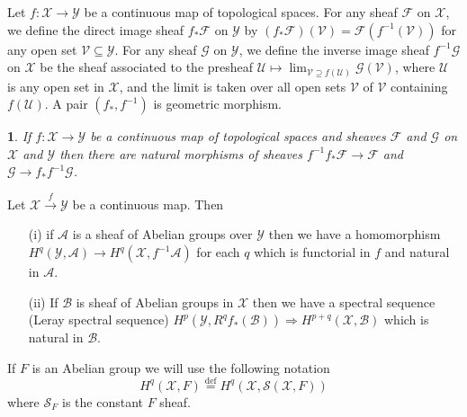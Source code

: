 \documentclass{beamer}
\theoremstyle{plain}
\newtheorem{empt}[prop]{}%
\newcommand{\sU}{\mathcal{U}}       %
\newcommand{\sV}{\mathcal{V}}       %
\newcommand{\sX}{\mathcal{X}}       %
\newcommand{\sY}{\mathcal{Y}}       %
\newcommand{\bydef}{\stackrel{\mathrm{def}}{=}}
\begin{document}
\begin{frame}

\begin{definition}\label{sheaf_inv_im_defn}
	Let $f: \sX\to \sY$ be a continuous map of topological spaces. For any sheaf  $\mathscr F$ on $\sX$, we define the \alert{direct image} sheaf  $f_*\mathscr F$ on $\sY$ by $\left(f_*\mathscr F\right)\left(\sV\right)= \mathscr F\left(f^{-1}\left(\sV\right)\right)$ for any open set $\sV \subseteq \sY$. For any sheaf  $\mathscr G$ on $\sY$, we define the \alert{inverse image} sheaf  $f^{-1}\mathscr G$ on $\sX$ be the sheaf  associated to the presheaf  $\sU \mapsto \lim_{\sV \supseteq f\left(\sU\right)} \mathscr G\left(\sV\right)$, where $\sU$ is any open set in $\sX$, and the limit is taken over  all open sets $\sV$ of $\sV$ containing $f\left(\sU\right)$. A pair $\left(f_*, f^{-1} \right)$ is \alert{geometric morphism}.
\end{definition}
\begin{empt}\label{sheaf_inv_im_rem} If $f: \sX\to \sY$ be a continuous map  
	of topological spaces and sheaves $\mathscr F$ and $\mathscr G$ on $\sX$ and $\sY$ then there are natural morphisms of sheaves $f^{-1}f_* \mathscr F \to \mathscr F$ and $\mathscr G \to f_*f^{-1}\mathscr G$. 
\end{empt}
\end{frame}
\begin{frame}

\begin{lemma}
	Let $\sX \xrightarrow{f} \sY$ be a continuous map. Then
	\begin{enumerate}		\item [(i)] 
		if $\mathscr A$ is a sheaf of Abelian groups over $\sY$  then we have a homomorphism $H^q\left(\sY, \mathscr A \right) \xrightarrow{} H^q \left(\sX, f^{-1}\mathscr A\right)$ for each $q$ which is functorial in $f$ and natural in $\mathscr A$.
		\item [(ii)] If $\mathscr B$ is sheaf of Abelian groups in $\sX$ then we have a spectral sequence (Leray spectral sequence) $H^p\left(\sY, R^qf_*\left(\mathscr B \right) \right)\Rightarrow H^{p + q}\left(\sX, \mathscr B \right)$ which is natural in $\mathscr B$.
	\end{enumerate}
\end{lemma}
\begin{definition}
If $F$ is an Abelian group we will use the following notation
$$
H^q \left(\sX, F  \right) \bydef H^q \left(\sX, \mathscr S\left(\sX, F \right)   \right)
$$
where $\mathscr S_F$ is the constant $F$ sheaf.
\end{definition}
\end{frame}
\end{document}

